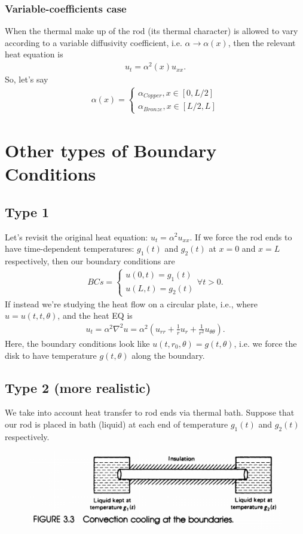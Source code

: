 \documentclass{book}
\theoremstyle{definition}
\begin{document}
\subsection{Variable-coefficients case}
When the thermal make up of the rod (its thermal character) is allowed to vary according to a variable diffusivity coefficient, i.e. $\alpha \rightarrow \alpha(x)$, then the relevant heat equation is
\begin{align*}
u_t = \alpha^2(x)u_{xx}.
\end{align*}
So, let's say
\begin{align*}
\alpha(x) = 
\begin{cases*}
\alpha_{Copper}, x\in[0,L/2]\\
\alpha_{Bronze}, x\in[L/2,L]
\end{cases*}
\end{align*}
\newpage
\chapter{Other types of Boundary Conditions}
\section{Type 1}
Let's revisit the original heat equation: $u_t = \alpha^2 u_{xx}$. If we force the rod ends to have time-dependent temperatures: $g_1(t)$ and $g_2(t)$ at $x=0$ and $x=L$ respectively, then our boundary conditions are
\begin{align*}
BCs = 
\begin{cases*}
u(0,t) = g_1(t)\\
u(L,t) = g_2(t)
\end{cases*}
\forall t > 0.
\end{align*} 
If instead we're studying the heat flow on a circular plate, i.e., where $u = u(t,t,\theta)$, and the heat EQ is 
\begin{align*}
u_t = \alpha^2 \nabla^2 u = \alpha^2\left( u_{rr} + \frac{1}{r}u_r + \frac{1}{r^2}u_{\theta\theta} \right).
\end{align*}
Here, the boundary conditions look like $u(t,r_0,\theta) = g(t,\theta)$, i.e. we force the disk to have temperature $g(t,\theta)$ along the boundary.
\section{Type 2 (more realistic)}
We take into account heat transfer to rod ends via thermal bath. Suppose that our rod is placed in bath (liquid) at each end of temperature $g_1(t)$ and $g_2(t)$ respectively. 
\begin{figure}[h!]
	\centering
	\includegraphics[scale=0.7]{type2.png}
\end{figure}
\end{document}
